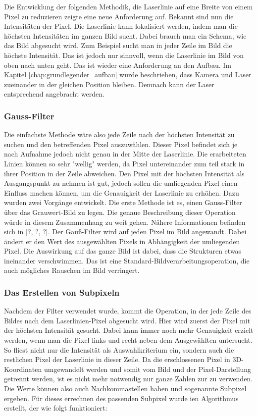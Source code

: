 		Die Entwicklung der folgenden Methodik, die Laserlinie auf eine Breite von einem Pixel zu reduzieren zeigte eine neue Anforderung auf. Bekannt sind nun die Intensitäten der Pixel. Die Laserlinie kann lokalisiert werden, indem man die höchsten Intensitäten im ganzen Bild sucht. Dabei brauch man ein Schema, wie das Bild abgesucht wird. Zum Beispiel sucht man in jeder Zeile im Bild die höchste Intensität. Das ist jedoch nur sinnvoll, wenn die Laserlinie im Bild von oben nach unten geht. Das ist wieder eine Anforderung an den Aufbau. Im Kapitel \ref{chap:grundlegender_aufbau} wurde beschrieben, dass Kamera und Laser zueinander in der gleichen Position bleiben. Demnach kann der Laser entsprechend angebracht werden. 
		
		\subsubsection{Gauss-Filter}
		Die einfachste Methode wäre also jede Zeile nach der höchsten Intensität zu suchen und den betreffenden Pixel auszuwählen. Dieser Pixel befindet sich je nach Aufnahme jedoch nicht genau in der Mitte der Laserlinie. Die erarbeiteten Linien können so sehr "wellig" werden, da Pixel untereinander zum teil stark in ihrer Position in der Zeile abweichen. Den Pixel mit der höchsten Intensität als Ausgangspunkt zu nehmen ist gut, jedoch sollen die umliegenden Pixel einen Einfluss machen können, um die Genauigkeit der Laserlinie zu erhöhen. Dazu wurden zwei Vorgänge entwickelt. \newline
		Die erste Methode ist es, einen Gauss-Filter über das Grauwert-Bild zu legen. Die genaue Beschreibung dieser Operation würde in diesem Zusammenhang zu weit gehen. Nähere Informationen befinden sich in [?, ?, ?]. Der Gauß-Filter wird auf jeden Pixel im Bild angewandt. Dabei ändert er den Wert des ausgewählten Pixels in Abhängigkeit der umliegenden Pixel. Die Auswirkung auf das ganze Bild ist dabei, dass die Strukturen etwas ineinander verschwimmen. Das ist eine Standard-Bildverarbeitungsoperation, die auch mögliches Rauschen im Bild verringert.
		
		\subsubsection{Das Erstellen von Subpixeln}
		Nachdem der Filter verwendet wurde, kommt die Operation, in der jede Zeile des Bildes nach dem Laserlinien-Pixel abgesucht wird. Hier wird zuerst der Pixel mit der höchsten Intensität gesucht. Dabei kann immer noch mehr  Genauigkeit erzielt werden, wenn man die Pixel links und recht neben dem Ausgewählten untersucht. So fliest nicht nur die Intensität als Auswahlkriterium ein, sondern auch die restlichen Pixel der Laserlinie in dieser Zeile. Da die erschlossenen Pixel in 3D-Koordinaten umgewandelt werden und somit vom Bild und der Pixel-Darstellung getrennt werden, ist es nicht mehr notwendig nur ganze Zahlen zur zu verwenden. Die Werte können also auch Nachkommastellen haben und sogenannte Subpixel ergeben. Für dieses errechnen des passenden Subpixel wurde ien Algorithmus erstellt, der wie folgt funktioniert:
		
